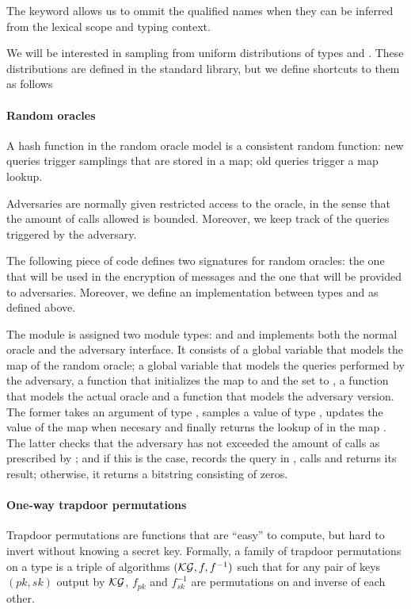 The  keyword allows us to ommit the qualified names when
they can be inferred from the lexical scope and typing context. 

We will be interested in sampling from uniform distributions of types
 and . These distributions are defined in
the standard library, but we define shortcuts to them as follows



\paragraph{Random oracles}
A hash function in the random oracle model is a consistent random
function: new queries trigger samplings that are stored in a map; old
queries trigger a map lookup. 

Adversaries are normally given restricted access to the oracle, in the
sense that the amount of calls allowed is bounded. Moreover, we keep
track of the queries triggered by the adversary. 

The following piece of code defines two signatures for random oracles:
the one that will be used in the encryption of messages and the one
that will be provided to adversaries. Moreover, we define an
implementation between types  and  as
defined above.



The module  is assigned two module types:  and
 and implements both the normal oracle and the adversary
interface. It consists of a global variable  that models the map
of the random oracle; a global variable  that models the queries
performed by the adversary, a function  that initializes the
map to  and the set to , a function  that
models the actual oracle and a function that models the adversary
version. The former takes an argument  of type ,
samples a value  of type , updates the value of
the map when necesary and finally returns the lookup of 
in the map . The latter checks that the adversary has not
exceeded the amount of calls as prescribed by ; and if this is
the case, records the query in , calls  and returns its
result; otherwise, it returns a bitstring consisting of zeros.


\paragraph{One-way trapdoor permutations}
Trapdoor permutations are functions that are ``easy'' to compute, but
hard to invert without knowing a secret key. Formally, a family
of trapdoor permutations on a type  is a triple of algorithms
$(\mathcal{KG},f,f^{-1})$ such that for any pair of keys $(pk,sk)$ output by
$\mathcal{KG}$, $f_{pk}$ and $f^{-1}_{sk}$ are permutations on
 and inverse of each other. 

